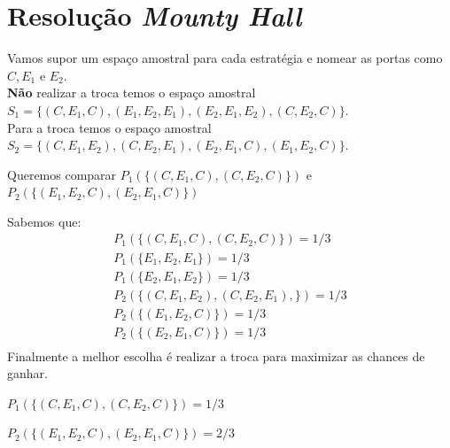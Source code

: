 \documentclass{article}
\renewcommand\bf[1]{\textbf{#1}}
\renewcommand\it[1]{\textit{#1}}
\begin{document}
\setlength{\abovedisplayskip}{12pt}
\setlength{\belowdisplayskip}{12pt}
\setlength{\abovedisplayshortskip}{0pt}
\setlength{\belowdisplayshortskip}{0pt}
\setlength{\jot}{0pt}

\section{Resolução \it{Mounty Hall}}
Vamos supor um espaço amostral para cada estratégia e nomear as portas como $C, E_1$ e $E_2$.
\\
\bf{Não} realizar a troca temos o espaço amostral $S_1 = \{(C,E_1,C), (E_1,E_2,E_1), (E_2,E_1,E_2),
(C,E_2,C)\}$.
\\
Para a troca temos o espaço amostral $S_2 = \{(C,E_1,E_2), (C,E_2,E_1), (E_2,E_1,C),
(E_1,E_2,C)\}$.

Queremos comparar $P_1(\{(C,E_1,C),(C,E_2,C)\})$ e $P_2(\{(E_1,E_2,C), (E_2,E_1,C)\})$

Sabemos que:
\begin{align*}
    P_1(\{(C,E_1,C),(C,E_2,C)\}) = 1/3 \\
    P_1(\{E_1,E_2,E_1\}) = 1/3 \\
    P_1(\{E_2,E_1,E_2\}) = 1/3 \\
    P_2(\{(C,E_1,E_2), (C,E_2,E_1),\}) = 1/3 \\
    P_2(\{(E_1,E_2,C)\}) = 1/3 \\
    P_2(\{(E_2,E_1,C)\}) = 1/3 \\
\end{align*}
Finalmente a melhor escolha é realizar a troca para maximizar as chances de ganhar.

$P_1(\{(C,E_1,C),(C,E_2,C)\}) = 1/3$

$P_2(\{(E_1,E_2,C), (E_2,E_1,C)\}) = 2/3$
\end{document}
